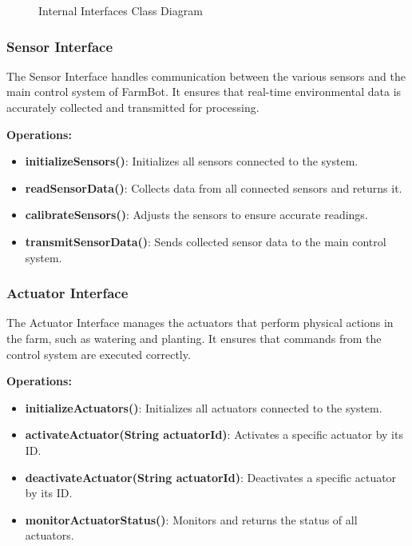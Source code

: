 \begin{figure}[H]
    \centering
    
    \caption{Internal Interfaces Class Diagram}
\end{figure}

\subsubsection{Sensor Interface}

The Sensor Interface handles communication between the various sensors and the main control system of FarmBot. It ensures that real-time environmental data is accurately collected and transmitted for processing.

\textbf{Operations:}
\begin{itemize}
    \item \textbf{initializeSensors()}: Initializes all sensors connected to the system.
    \item \textbf{readSensorData()}: Collects data from all connected sensors and returns it.
    \item \textbf{calibrateSensors()}: Adjusts the sensors to ensure accurate readings.
    \item \textbf{transmitSensorData()}: Sends collected sensor data to the main control system.
\end{itemize}

\subsubsection{Actuator Interface}

The Actuator Interface manages the actuators that perform physical actions in the farm, such as watering and planting. It ensures that commands from the control system are executed correctly.

\textbf{Operations:}
\begin{itemize}
    \item \textbf{initializeActuators()}: Initializes all actuators connected to the system.
    \item \textbf{activateActuator(String actuatorId)}: Activates a specific actuator by its ID.
    \item \textbf{deactivateActuator(String actuatorId)}: Deactivates a specific actuator by its ID.
    \item \textbf{monitorActuatorStatus()}: Monitors and returns the status of all actuators.
\end{itemize}

